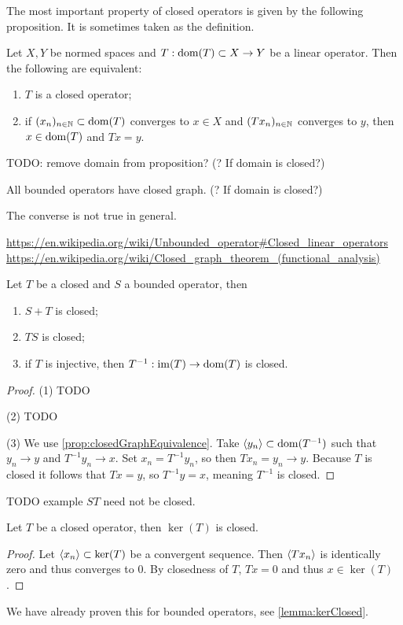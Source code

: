 The most important property of closed operators is given by the following proposition. It is sometimes taken as the definition.
\begin{proposition} \label{prop:closedGraphEquivalence}
Let $X,Y$ be normed spaces and $T: \operatorname{dom}(T)\subset X \to Y$ be a linear operator. Then
the following are equivalent:
\begin{enumerate}
\item $T$ is a closed operator;
\item if $(x_n)_{n\in\mathbb{N}}\subset \operatorname{dom}(T)$ converges to $x\in X$ and $(Tx_n)_{n\in\mathbb{N}}$ converges to $y$, then $x\in\operatorname{dom}(T)$ and $Tx = y$.
\end{enumerate}
\end{proposition}
TODO: remove domain from proposition? (? If domain is closed?)
\begin{corollary}
All bounded operators have closed graph. (? If domain is closed?)
\end{corollary}
The converse is not true in general.

\url{https://en.wikipedia.org/wiki/Unbounded_operator#Closed_linear_operators}
\url{https://en.wikipedia.org/wiki/Closed_graph_theorem_(functional_analysis)}

\begin{proposition} \label{prop:algebraClosedOperators}
Let $T$ be a closed and $S$ a bounded operator, then
\begin{enumerate}
\item $S+T$ is closed;
\item $TS$ is closed;
\item if $T$ is injective, then $T^{-1}: \operatorname{im}(T) \to \operatorname{dom}(T)$ is closed.
\end{enumerate}
\end{proposition}
\begin{proof}
(1) TODO

(2) TODO

(3) We use \ref{prop:closedGraphEquivalence}. Take $\langle y_n \rangle\subset \operatorname{dom}(T^{-1})$ such that $y_n\to y$ and $T^{-1}y_n\to x$. Set $x_n = T^{-1}y_n$, so then $Tx_n = y_n\to y$. Because $T$ is closed it follows that $Tx = y$, so $T^{-1}y = x$, meaning $T^{-1}$ is closed.
\end{proof}
TODO example $ST$ need not be closed.

\begin{lemma}
Let $T$ be a closed operator, then $\ker(T)$ is closed.
\end{lemma}
\begin{proof}
Let $\langle x_n \rangle\subset\ker(T)$ be a convergent sequence. Then $\langle Tx_n \rangle$ is identically zero and thus converges to $0$. By closedness of $T$, $Tx = 0$ and thus $x\in\ker(T)$. 
\end{proof}
We have already proven this for bounded operators, see \ref{lemma:kerClosed}.

